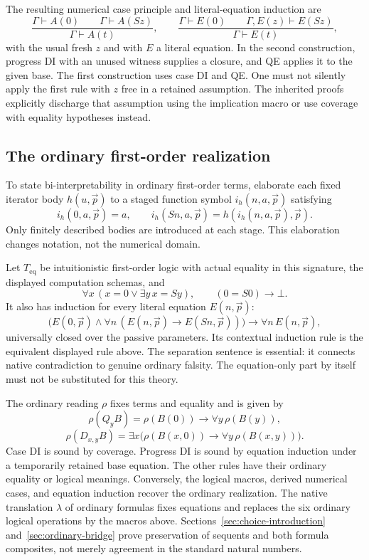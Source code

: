The resulting numerical case principle and literal-equation induction are
\[
 \frac{\Gamma\vdash A(0)\qquad\Gamma\vdash A(Sz)}
      {\Gamma\vdash A(t)},
 \qquad
 \frac{\Gamma\vdash E(0)\qquad\Gamma,E(z)\vdash E(Sz)}
      {\Gamma\vdash E(t)},
\]
with the usual fresh $z$ and with $E$ a literal equation. In the second
construction, progress DI with an unused witness supplies a closure, and QE
applies it to the given base. The first construction uses case DI and QE.
One must not silently apply the first rule with $z$ free in a retained
assumption. The inherited proofs explicitly discharge that assumption using
the implication macro or use coverage with equality hypotheses instead.

\subsection{The ordinary first-order realization}

To state bi-interpretability in ordinary first-order terms, elaborate each
fixed iterator body $h(u,\vec p)$ to a staged function symbol
$i_h(n,a,\vec p)$ satisfying
\[
 i_h(0,a,\vec p)=a,\qquad
 i_h(Sn,a,\vec p)=h(i_h(n,a,\vec p),\vec p).
\]
Only finitely described bodies are introduced at each stage. This elaboration
changes notation, not the numerical domain.

Let $T_{\mathrm{eq}}$ be intuitionistic first-order logic with actual equality
in this signature, the displayed computation schemas, and
\[
 \forall x\,(x=0\vee\exists y\,x=Sy),
 \qquad (0=S0)\to\bot.
\]
It also has induction for every literal equation $E(n,\vec p)$:
\[
 \bigl(E(0,\vec p)\wedge
       \forall n\,(E(n,\vec p)\to E(Sn,\vec p))\bigr)
       \to\forall n\,E(n,\vec p),
\]
universally closed over the passive parameters. Its contextual induction
rule is the equivalent displayed rule above. The separation sentence is
essential: it connects native contradiction to genuine ordinary falsity.
The equation-only part by itself must not be substituted for this theory.

The ordinary reading $\rho$ fixes terms and equality and is given by
\[
 \rho(Q_yB)=\rho(B(0))\to\forall y\,\rho(B(y)),
\]
\[
 \rho(D_{x,y}B)=
   \exists x\bigl(\rho(B(x,0))\to\forall y\,\rho(B(x,y))\bigr).
\]
Case DI is sound by coverage. Progress DI is sound by equation induction
under a temporarily retained base equation. The other rules have their
ordinary equality or logical meanings. Conversely, the logical macros,
derived numerical cases, and equation induction recover the ordinary
realization. The native translation $\lambda$ of ordinary formulas fixes
equations and replaces the six ordinary logical operations by the macros
above. Sections~\ref{sec:choice-introduction} and~\ref{sec:ordinary-bridge}
prove preservation of sequents and both formula composites, not merely
agreement in the standard natural numbers.

